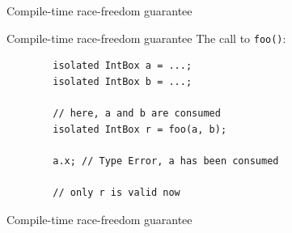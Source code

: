 \documentclass[handout]{beamer} %
\begin{document}
\begin{frame}{Compile-time race-freedom guarantee}
	\begin{center}
	\end{center}
\end{frame}

\begin{frame}[fragile]{Compile-time race-freedom guarantee}
	The call to \texttt{foo()}:
	\begin{lstlisting}
        isolated IntBox a = ...;
        isolated IntBox b = ...;

        // here, a and b are consumed
        isolated IntBox r = foo(a, b);

        a.x; // Type Error, a has been consumed
        
        // only r is valid now
	\end{lstlisting}
\end{frame}


\begin{frame}{Compile-time race-freedom guarantee}
	\begin{center}
	\end{center}
\end{frame}
\end{document}
